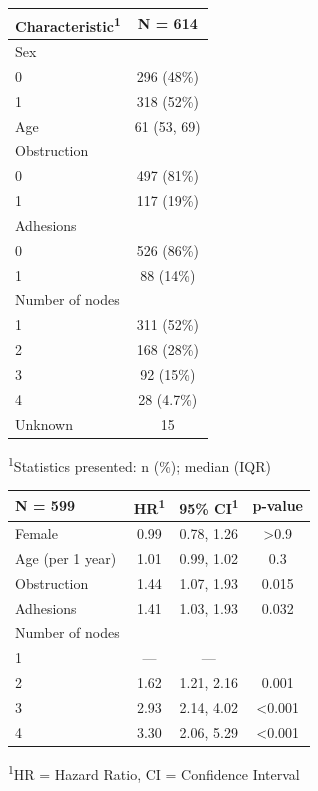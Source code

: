 \documentclass[]{book}
\begin{document}
\captionsetup[table]{labelformat=empty,skip=1pt}
\begin{longtable}{lc}
\toprule
\textbf{Characteristic}\textsuperscript{1} & \textbf{N = 614} \\ 
\midrule
Sex &  \\ 
0 & 296 (48\%) \\ 
1 & 318 (52\%) \\ 
Age & 61 (53, 69) \\ 
Obstruction &  \\ 
0 & 497 (81\%) \\ 
1 & 117 (19\%) \\ 
Adhesions &  \\ 
0 & 526 (86\%) \\ 
1 & 88 (14\%) \\ 
Number of nodes &  \\ 
1 & 311 (52\%) \\ 
2 & 168 (28\%) \\ 
3 & 92 (15\%) \\ 
4 & 28 (4.7\%) \\ 
Unknown & 15 \\ 
\bottomrule
\end{longtable}
\vspace{-5mm}
\begin{minipage}{\linewidth}
\textsuperscript{1}Statistics presented: n (\%); median (IQR) \\ 
\end{minipage}

\captionsetup[table]{labelformat=empty,skip=1pt}
\begin{longtable}{lccc}
\toprule
\textbf{N = 599} & \textbf{HR}\textsuperscript{1} & \textbf{95\% CI}\textsuperscript{1} & \textbf{p-value} \\ 
\midrule
Female & 0.99 & 0.78, 1.26 & >0.9 \\ 
Age (per 1 year) & 1.01 & 0.99, 1.02 & 0.3 \\ 
Obstruction & 1.44 & 1.07, 1.93 & 0.015 \\ 
Adhesions & 1.41 & 1.03, 1.93 & 0.032 \\ 
Number of nodes &  &  &  \\ 
1 & --- & --- &  \\ 
2 & 1.62 & 1.21, 2.16 & 0.001 \\ 
3 & 2.93 & 2.14, 4.02 & <0.001 \\ 
4 & 3.30 & 2.06, 5.29 & <0.001 \\ 
\bottomrule
\end{longtable}
\vspace{-5mm}
\begin{minipage}{\linewidth}
\textsuperscript{1}HR = Hazard Ratio, CI = Confidence Interval \\ 
\end{minipage}
\end{document}
